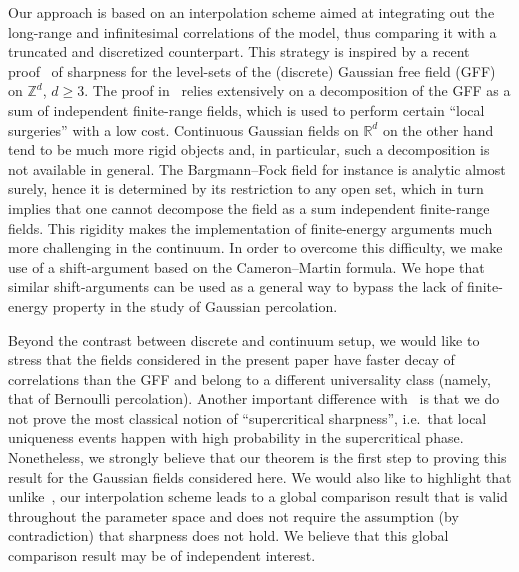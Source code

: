 \documentclass[AHL,Unicode,longabstracts,published]{cedram}
\newcommand{\R}{\mathbb{R}}
\newcommand{\Z}{\mathbb{Z}}
\newcommand{\R}{\mathbb{R}}
\newcommand{\Z}{\mathbb{Z}}
\begin{document}
Our approach is based on an interpolation scheme aimed at integrating out the long-range and infinitesimal correlations of the model, thus comparing it with a truncated and discretized counterpart. This strategy is inspired by a recent proof~\cite{DGRS19} of sharpness for the level-sets of the (discrete) Gaussian free field (GFF) on $\Z^d$, $d\geq 3$. The proof in~\cite{DGRS19} relies extensively on a decomposition of the GFF as a sum of independent finite-range fields, which is used to perform certain ``local surgeries'' with a low cost. Continuous Gaussian fields on $\R^d$ on the other hand tend to be much more rigid objects and, in particular, such a decomposition is not available in general. The Bargmann--Fock field for instance is analytic almost surely, hence it is determined by its restriction to any open set, which in turn implies that one cannot decompose the field as a sum independent finite-range fields. This rigidity makes the implementation of finite-energy arguments much more challenging in the continuum. In order to overcome this difficulty, we make use of a shift-argument based on the Cameron--Martin formula. We hope that similar shift-arguments can be used as a general way to bypass the lack of finite-energy property in the study of Gaussian percolation.

Beyond the contrast between discrete and continuum setup, we would like to stress that the fields considered in the present paper have faster decay of correlations than the GFF and belong to a different universality class (namely, that of Bernoulli percolation). Another important difference with~\cite{DGRS19} is that we do not prove the most classical notion of ``supercritical sharpness'', i.e.~that local uniqueness events happen with high probability in the supercritical phase. Nonetheless, we strongly believe that our theorem is the first step to proving this result for the Gaussian fields considered here. We would also like to highlight that unlike~\cite{DGRS19}, our interpolation scheme leads to a global comparison result that is valid throughout the parameter space and does not require the assumption (by contradiction) that sharpness does not hold. We believe that this global comparison result may be of independent interest.
\end{document}
